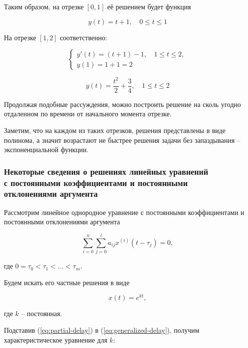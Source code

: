 Таким образом, на отрезке $[0,1]$ её решением будет функция

\begin{equation}
y(t) = t+1, \quad 0 \leq t \leq 1
\end{equation}

На отрезке $[1,2]$ соответственно:

\begin{equation}
\left\{
\begin{aligned}
y'(t) = (t+1)-1, \quad 1 \leq t \leq 2,\\
y(1) = 1 + 1 = 2
\end{aligned}
\right.
\end{equation}

\begin{equation}
y(t) = \dfrac{t^2}{2} + \dfrac{3}{4}, \quad 1 \leq t \leq 2
\end{equation}

Продолжая подобные рассуждения, можно построить решение на сколь угодно отдаленном по времени от начального момента отрезке.

Заметим, что на каждом из таких отрезков, решения представлены в виде полинома, а значит возрастают не быстрее решения задачи без запаздывания \--- экспоненциальной функции.

\subsubsection{Некоторые сведения о решениях линейных уравнений\\с постоянными коэффициентами и постоянными\\отклонениями аргумента}
Рассмотрим линейное однородное уравнение с постоянными коэффициентами и постоянными отклонениями аргумента

\begin{equation}\label{eq:generalized-delay}
\sum\limits_{i=0}^{n} \sum\limits_{j=0}^{l} a_{ij} x^{(i)}(t-\tau_j) = 0,
\end{equation}

где $0=\tau_0 < \tau_1 < \dots < \tau_m$.

Будем искать его частные решения в виде

\begin{equation}\label{eq:partial-delay}
x(t) = e^{kt},
\end{equation}

где $k$ \--- постоянная.

Подставив (\ref{eq:partial-delay}) в (\ref{eq:generalized-delay}), получим характеристическое уравнение для $k$:

